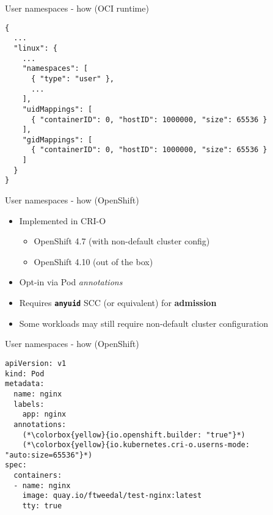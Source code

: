 \documentclass[ignorenonframetext,aspectratio=169,12pt]{beamer}
\begin{document}
\begin{frame}[fragile]{User namespaces - how (OCI runtime)}
\protect\hypertarget{userns-how-oci}{}
\begin{lstlisting}[basicstyle=\ttfamily\small]
{
  ...
  "linux": {
    ...
    "namespaces": [
      { "type": "user" },
      ...
    ],
    "uidMappings": [
      { "containerID": 0, "hostID": 1000000, "size": 65536 }
    ],
    "gidMappings": [
      { "containerID": 0, "hostID": 1000000, "size": 65536 }
    ]
  }
}
\end{lstlisting}
\end{frame}

\begin{frame}{User namespaces - how (OpenShift)}
\protect\hypertarget{userns-how-openshift}{}
\begin{itemize}
  \item Implemented in CRI-O
    \begin{itemize}
      \item OpenShift 4.7 (with non-default cluster config)
      \item OpenShift 4.10 (out of the box)
    \end{itemize}
  \item Opt-in via Pod {\em annotations}
  \item Requires \textbf{\texttt{anyuid}} SCC (or equivalent) for {\bf admission}
  \item Some workloads may still require non-default cluster
    configuration
\end{itemize}
\end{frame}

\begin{frame}[fragile]{User namespaces - how (OpenShift)}
\protect\hypertarget{userns-how-openshift-2}{}
\begin{lstlisting}
apiVersion: v1
kind: Pod
metadata:
  name: nginx
  labels:
    app: nginx
  annotations:
    (*\colorbox{yellow}{io.openshift.builder: "true"}*)
    (*\colorbox{yellow}{io.kubernetes.cri-o.userns-mode: "auto:size=65536"}*)
spec:
  containers:
  - name: nginx
    image: quay.io/ftweedal/test-nginx:latest
    tty: true
\end{lstlisting}
\end{frame}
\end{document}
